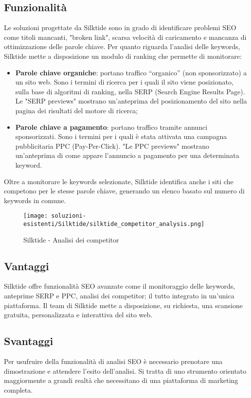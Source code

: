 \subsection{Funzionalità}
\par Le soluzioni progettate da Silktide sono in grado di identificare problemi SEO come titoli mancanti, "broken link", scarsa velocità di caricamento e mancanza di ottimizzazione delle parole chiave. Per quanto riguarda l’analisi delle keywords, Silktide mette a disposizione un modulo di ranking che permette di monitorare:
\begin{itemize}
    \item \textbf{Parole chiave organiche}: portano traffico “organico” (non sponsorizzato) a un sito web. Sono i termini di ricerca per i quali il sito viene posizionato, sulla base di algoritmi di ranking, nella SERP (Search Engine Results Page). Le "SERP previews" mostrano un'anteprima del posizionamento del sito nella pagina dei risultati del motore di ricerca;
    \item \textbf{Parole chiave a pagamento}: portano traffico tramite annunci sponsorizzati. Sono i termini per i quali è stata attivata una campagna pubblicitaria PPC (Pay-Per-Click). "Le PPC previews" mostrano un'anteprima di come appare l'annuncio a pagamento per una determinata keyword.
\end{itemize}
\par Oltre a monitorare le keywords selezionate, Silktide identifica anche i siti che competono per le stesse parole chiave, generando un elenco basato sul numero di keywords in comune.
\begin{figure}[H]
    \centering 
    \texttt{[image: soluzioni-esistenti/Silktide/silktide\_competitor\_analysis.png]} 
    \caption{Silktide - Analisi dei competitor}
\end{figure}

\subsection{Vantaggi}
\par Silktide offre funzionalità SEO avanzate come il monitoraggio delle keywords, anteprime SERP e PPC, analisi dei competitor; il tutto integrato in un'unica piattaforma. Il team di Silktide mette a disposizione, su richiesta, una scansione gratuita, personalizzata e interattiva del sito web.

\subsection{Svantaggi}
\par Per usufruire della funzionalità di analisi SEO è necessario prenotare una dimostrazione e attendere l'esito dell'analisi. Si tratta di uno strumento orientato maggiormente a grandi realtà che necessitano di una piattaforma di marketing completa.

